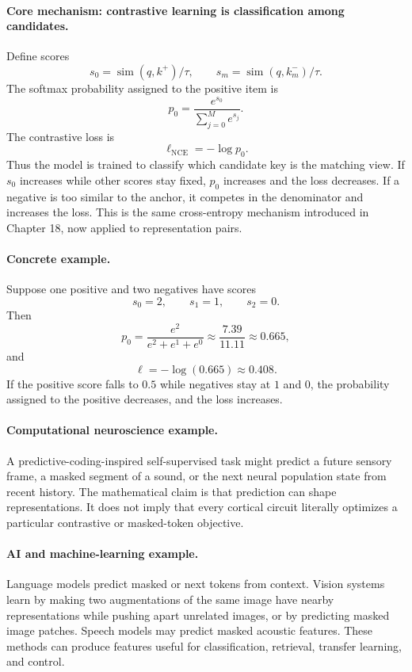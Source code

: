 \paragraph{Core mechanism: contrastive learning is classification among candidates.}
Define scores
\[
s_0=\operatorname{sim}(q,k^+)/\tau,\qquad
s_m=\operatorname{sim}(q,k_m^-)/\tau.
\]
The softmax probability assigned to the positive item is
\[
p_0=\frac{e^{s_0}}{\sum_{j=0}^M e^{s_j}}.
\]
The contrastive loss is
\[
\ell_{\mathrm{NCE}}=-\log p_0.
\]
Thus the model is trained to classify which candidate key is the matching view. If \(s_0\) increases while other scores stay fixed, \(p_0\) increases and the loss decreases. If a negative is too similar to the anchor, it competes in the denominator and increases the loss. This is the same cross-entropy mechanism introduced in Chapter 18, now applied to representation pairs.

\paragraph{Concrete example.}
Suppose one positive and two negatives have scores
\[
s_0=2,\qquad s_1=1,\qquad s_2=0.
\]
Then
\[
p_0=\frac{e^2}{e^2+e^1+e^0}\approx \frac{7.39}{11.11}\approx0.665,
\]
and
\[
\ell=-\log(0.665)\approx0.408.
\]
If the positive score falls to \(0.5\) while negatives stay at \(1\) and \(0\), the probability assigned to the positive decreases, and the loss increases.

\paragraph{Computational neuroscience example.}
A predictive-coding-inspired self-supervised task might predict a future sensory frame, a masked segment of a sound, or the next neural population state from recent history. The mathematical claim is that prediction can shape representations. It does not imply that every cortical circuit literally optimizes a particular contrastive or masked-token objective.

\paragraph{AI and machine-learning example.}
Language models predict masked or next tokens from context. Vision systems learn by making two augmentations of the same image have nearby representations while pushing apart unrelated images, or by predicting masked image patches. Speech models may predict masked acoustic features. These methods can produce features useful for classification, retrieval, transfer learning, and control.

